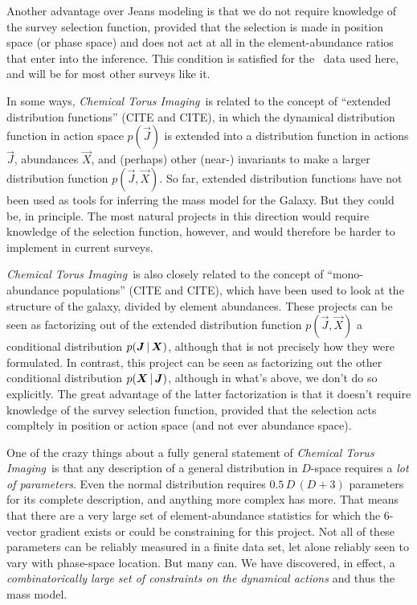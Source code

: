 \documentclass[modern]{aastex63}
\newcommand{\methodname}{\textsl{Chemical Torus Imaging}}
\newcommand{\apogee}{\acronym{APOGEE}}
\begin{document}
Another advantage over Jeans modeling is that
we do not require knowledge of the survey selection
function, provided that the selection is made in position space (or phase
space) and does not act at all in the element-abundance ratios that
enter into the inference.
This condition is satisfied for the \apogee\ data used here, and will be for
most other surveys like it.

In some ways, \methodname\ is related to the concept of ``extended
distribution functions'' (CITE and CITE), in which the dynamical
distribution function in action space $p(\vec{J})$ is extended into a distribution
function in actions $\vec{J}$, abundances $\vec{X}$, and (perhaps)
other (near-) invariants to make a larger distribution function $p(\vec{J},\vec{X})$.
So far, extended distribution functions have not been used as tools
for inferring the mass model for the Galaxy. But they could be, in principle.
The most natural projects in this direction would require knowledge of the
selection function, however, and would therefore be harder to implement in
current surveys.

\methodname\ is also closely related to the concept of ``mono-abundance
populations'' (CITE and CITE), which have been used to look at the structure
of the galaxy, divided by element abundances.
These projects can be seen as factorizing out of the extended distribution
function $p(\vec{J},\vec{X})$ a conditional distribution
$p(\boldsymbol{J}\,|\,\boldsymbol{X})$, although that is not precisely how they were
formulated.
In contrast, this project can be seen as factorizing out the other conditional
distribution $p(\boldsymbol{X}\,|\,\boldsymbol{J})$, although in what's above, we don't do
so explicitly.
The great advantage of the latter factorization is that it doesn't require
knowledge of the survey selection function, provided that the selection acts
compltely in position or action space (and not ever abundance space).

One of the crazy things about a fully general statement of \methodname\ is
that any description of a general distribution in $D$-space
requires a \emph{lot of parameters}.
Even the normal distribution requires $0.5\,D\,(D+3)$ parameters for its
complete description, and anything more complex has more.
That means that there are a very large set of element-abundance statistics for which the
6-vector gradient exists or could be constraining for this project.
Not all of these parameters can be reliably measured in a finite data set,
let alone reliably seen to vary with phase-space location.
But many can.
We have discovered, in effect, a \emph{combinatorically large set of constraints on the
dynamical actions} and thus the mass model.
\end{document}
